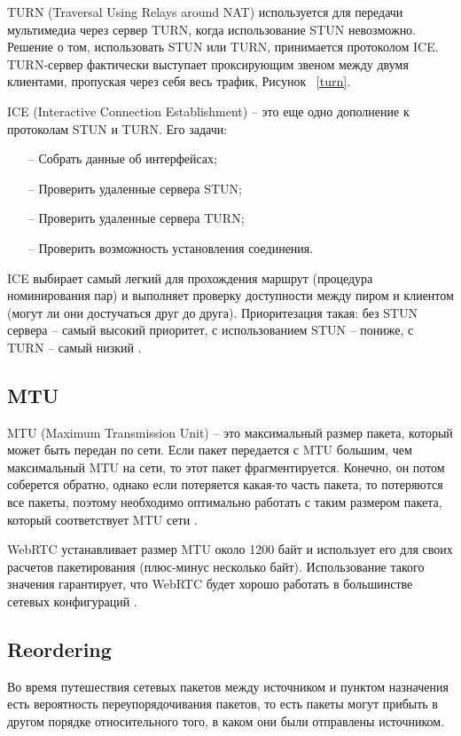 TURN (Traversal Using Relays around NAT) используется для передачи мультимедиа через сервер TURN, когда использование STUN невозможно. Решение о том, использовать STUN или TURN, принимается протоколом ICE. TURN-сервер фактически выступает проксирующим звеном между двумя клиентами, пропуская через себя весь трафик, Рисунок ~\ref{turn}.

ICE (Interactive Connection Establishment) -- это еще одно дополнение к протоколам STUN и TURN. Его задачи:
\begin{itemize}
	\item[--] Собрать данные об интерфейсах;
        \item[--] Проверить удаленные сервера STUN;
        \item[--] Проверить удаленные сервера TURN;
        \item[--] Проверить возможность установления соединения.
\end{itemize}

ICE выбирает самый легкий для прохождения маршрут (процедура номинирования пар) и выполняет проверку доступности между пиром и клиентом (могут ли они достучаться друг до друга). Приоритезация такая: без STUN сервера -- самый высокий приоритет, с использованием STUN -- пониже, с TURN -- самый низкий \cite{v27}.

\subsection{MTU}

MTU (Maximum Transmission Unit) -- это максимальный размер пакета, который может быть передан по сети. Если пакет передается с MTU большим, чем максимальный MTU на сети, то этот пакет фрагментируется. Конечно, он потом соберется обратно, однако если потеряется какая-то часть пакета, то потеряются все пакеты, поэтому необходимо оптимально работать с таким размером пакета, который соответствует MTU сети \cite{v4}.

WebRTC устанавливает размер MTU около 1200 байт и использует его для своих расчетов пакетирования (плюс-минус несколько байт). Использование такого значения гарантирует, что WebRTC будет хорошо работать в большинстве сетевых конфигураций \cite{v14}.

\subsection{Reordering}

Во время путешествия сетевых пакетов между источником и пунктом назначения есть вероятность переупорядочивания пакетов, то есть пакеты могут прибыть в другом порядке относительного того, в каком они были отправлены источником.

